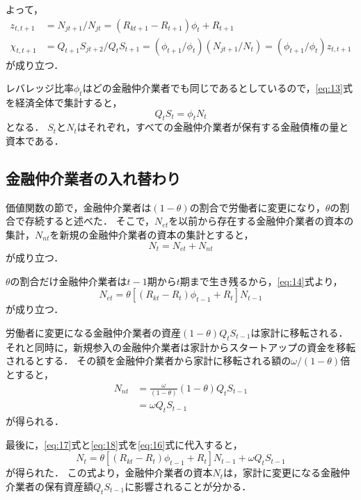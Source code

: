 \documentclass[dvipdfmx]{jlreq}
\begin{document}
よって，
\begin{align}
  z_{t,t+1} &= N_{jt+1} / N_{jt} = (R_{kt+1} - R_{t+1}) \phi_t + R_{t+1} \\
  \chi_{t,t+1} &= Q_{t+1} S_{jt+2} / Q_t S_{t+1} = (\phi_{t+1} / \phi_t) (N_{jt+1} / N_t) = (\phi_{t+1} / \phi_t) z_{t,t+1}
\end{align}
が成り立つ．

レバレッジ比率$\phi_t$はどの金融仲介業者でも同じであるとしているので，\eqref{eq:13}式を経済全体で集計すると，
\begin{equation}
  Q_t S_t = \phi_t N_t
\end{equation}
となる．
$S_t$と$N_t$はそれぞれ，すべての金融仲介業者が保有する金融債権の量と資本である．

\subsection*{金融仲介業者の入れ替わり}
価値関数の節で，金融仲介業者は$(1-\theta)$の割合で労働者に変更になり，$\theta$の割合で存続すると述べた．
そこで，$N_{et}$を以前から存在する金融仲介業者の資本の集計，$N_{nt}$を新規の金融仲介業者の資本の集計とすると，
\begin{equation} \label{eq:16}
  N_t = N_{et} + N_{nt}
\end{equation}
が成り立つ．

$\theta$の割合だけ金融仲介業者は$t-1$期から$t$期まで生き残るから，\eqref{eq:14}式より，
\begin{equation} \label{eq:17}
  N_{et} = \theta [(R_{kt} - R_t) \phi_{t-1} + R_t] N_{t-1}
\end{equation}
が成り立つ．

労働者に変更になる金融仲介業者の資産$(1-\theta) Q_t S_{t-1}$は家計に移転される．
それと同時に，新規参入の金融仲介業者は家計からスタートアップの資金を移転されるとする．
その額を金融仲介業者から家計に移転される額の$\omega / (1-\theta)$倍とすると，
\begin{align}
  N_{nt} &= \frac{\omega}{(1-\theta)} (1-\theta) Q_t S_{t-1} \\
  &= \omega Q_t S_{t-1} \label{eq:18}
\end{align}
が得られる．

最後に，\eqref{eq:17}式と\eqref{eq:18}式を\eqref{eq:16}式に代入すると，
\begin{equation}
  N_t = \theta [(R_{kt} - R_t) \phi_{t-1} + R_t] N_{t-1} + \omega Q_t S_{t-1}
\end{equation}
が得られた．
この式より，金融仲介業者の資本$N_t$は，家計に変更になる金融仲介業者の保有資産額$Q_t S_{t-1}$に影響されることが分かる．

\nocite{*}
\printbibliography
\end{document}
